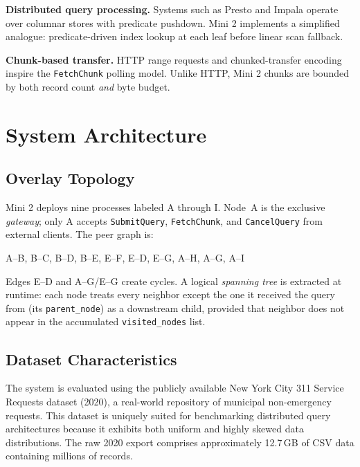 \documentclass[conference]{IEEEtran}
\begin{document}
\textbf{Distributed query processing.} Systems such as Presto \cite{sethi2019presto}
and Impala \cite{wanderman2014impala} operate over columnar stores with
predicate pushdown. Mini 2 implements a simplified analogue: predicate-driven
index lookup at each leaf before linear scan fallback.

\textbf{Chunk-based transfer.} HTTP range requests and chunked-transfer encoding
\cite{fielding1999http} inspire the \texttt{FetchChunk} polling model. Unlike
HTTP, Mini 2 chunks are bounded by both record count \emph{and} byte budget.

\section{System Architecture}
\label{sec:arch}

\subsection{Overlay Topology}

Mini 2 deploys nine processes labeled A through I. Node~A is the exclusive
\emph{gateway}; only A accepts \texttt{SubmitQuery}, \texttt{FetchChunk}, and
\texttt{CancelQuery} from external clients. The peer graph is:

\begin{center}
A--B,\; B--C,\; B--D,\; B--E,\; E--F,\; E--D,\; E--G,\; A--H,\; A--G,\; A--I
\end{center}

Edges E--D and A--G/E--G create cycles. A logical \emph{spanning tree} is
extracted at runtime: each node treats every neighbor except the one it
received the query from (its \texttt{parent\_node}) as a downstream child,
provided that neighbor does not appear in the accumulated
\texttt{visited\_nodes} list.

\subsection{Dataset Characteristics}

The system is evaluated using the publicly available New York City 311 Service Requests dataset (2020), a real-world repository of municipal non-emergency requests. This dataset is uniquely suited for benchmarking distributed query architectures because it exhibits both uniform and highly skewed data distributions. The raw 2020 export comprises approximately 12.7\,GB of CSV data containing millions of records. 
\end{document}
